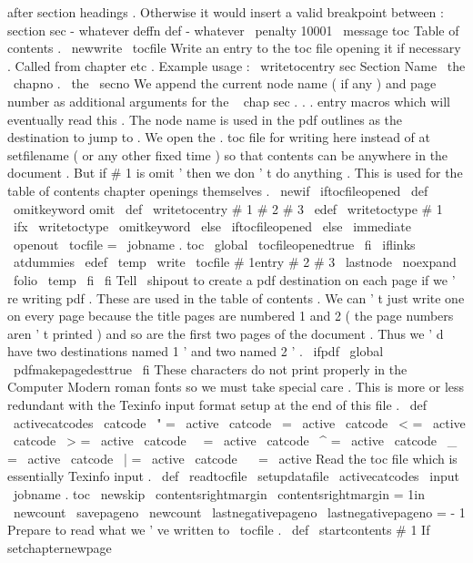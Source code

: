 {{{after
%
section
headings
.
Otherwise
it
would
insert
a
valid
breakpoint
between
:
%
%
section
sec
-
whatever
%
deffn
def
-
whatever
\
penalty
10001
}
\
message
{
toc
}
%
Table
of
contents
.
\
newwrite
\
tocfile
%
Write
an
entry
to
the
toc
file
opening
it
if
necessary
.
%
Called
from
chapter
etc
.
%
%
Example
usage
:
\
writetocentry
{
sec
}
{
Section
Name
}
{
\
the
\
chapno
.
\
the
\
secno
}
%
We
append
the
current
node
name
(
if
any
)
and
page
number
as
additional
%
arguments
for
the
\
{
chap
sec
.
.
.
}
entry
macros
which
will
eventually
%
read
this
.
The
node
name
is
used
in
the
pdf
outlines
as
the
%
destination
to
jump
to
.
%
%
We
open
the
.
toc
file
for
writing
here
instead
of
at
setfilename
(
or
%
any
other
fixed
time
)
so
that
contents
can
be
anywhere
in
the
document
.
%
But
if
#
1
is
omit
'
then
we
don
'
t
do
anything
.
This
is
used
for
the
%
table
of
contents
chapter
openings
themselves
.
%
\
newif
\
iftocfileopened
\
def
\
omitkeyword
{
omit
}
%
%
\
def
\
writetocentry
#
1
#
2
#
3
{
%
\
edef
\
writetoctype
{
#
1
}
%
\
ifx
\
writetoctype
\
omitkeyword
\
else
\
iftocfileopened
\
else
\
immediate
\
openout
\
tocfile
=
\
jobname
.
toc
\
global
\
tocfileopenedtrue
\
fi
%
\
iflinks
{
\
atdummies
\
edef
\
temp
{
%
\
write
\
tocfile
{
#
1entry
{
#
2
}
{
#
3
}
{
\
lastnode
}
{
\
noexpand
\
folio
}
}
}
%
\
temp
}
%
\
fi
\
fi
%
%
Tell
\
shipout
to
create
a
pdf
destination
on
each
page
if
we
'
re
%
writing
pdf
.
These
are
used
in
the
table
of
contents
.
We
can
'
t
%
just
write
one
on
every
page
because
the
title
pages
are
numbered
%
1
and
2
(
the
page
numbers
aren
'
t
printed
)
and
so
are
the
first
%
two
pages
of
the
document
.
Thus
we
'
d
have
two
destinations
named
%
1
'
and
two
named
2
'
.
\
ifpdf
\
global
\
pdfmakepagedesttrue
\
fi
}
%
These
characters
do
not
print
properly
in
the
Computer
Modern
roman
%
fonts
so
we
must
take
special
care
.
This
is
more
or
less
redundant
%
with
the
Texinfo
input
format
setup
at
the
end
of
this
file
.
%
\
def
\
activecatcodes
{
%
\
catcode
\
"
=
\
active
\
catcode
\
=
\
active
\
catcode
\
<
=
\
active
\
catcode
\
>
=
\
active
\
catcode
\
\
=
\
active
\
catcode
\
^
=
\
active
\
catcode
\
_
=
\
active
\
catcode
\
|
=
\
active
\
catcode
\
~
=
\
active
}
%
Read
the
toc
file
which
is
essentially
Texinfo
input
.
\
def
\
readtocfile
{
%
\
setupdatafile
\
activecatcodes
\
input
\
jobname
.
toc
}
\
newskip
\
contentsrightmargin
\
contentsrightmargin
=
1in
\
newcount
\
savepageno
\
newcount
\
lastnegativepageno
\
lastnegativepageno
=
-
1
%
Prepare
to
read
what
we
'
ve
written
to
\
tocfile
.
%
\
def
\
startcontents
#
1
{
%
%
If
setchapternewpage
}}}
